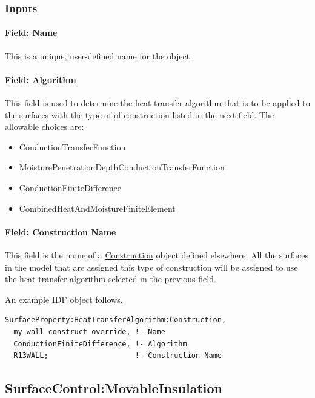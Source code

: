 \subsubsection{Inputs}\label{inputs-3}

\paragraph{Field: Name}

This is a unique, user-defined name for the object.

\paragraph{Field: Algorithm}\label{field-algorithm-3}

This field is used to determine the heat transfer algorithm that is to be applied to the surfaces with the type of of construction listed in the next field. The allowable choices are:

\begin{itemize}
\item
  ConductionTransferFunction
\item
  MoisturePenetrationDepthConductionTransferFunction
\item
  ConductionFiniteDifference
\item
  CombinedHeatAndMoistureFiniteElement
\end{itemize}

\paragraph{Field: Construction Name}\label{field-construction-name}

This field is the name of a \hyperref[construction-000]{Construction} object defined elsewhere. All the surfaces in the model that are assigned this type of construction will be assigned to use the heat transfer algorithm selected in the previous field.

An example IDF object follows.

\begin{lstlisting}
SurfaceProperty:HeatTransferAlgorithm:Construction,
  my wall construct override, !- Name
  ConductionFiniteDifference, !- Algorithm
  R13WALL;                    !- Construction Name
\end{lstlisting}

\subsection{SurfaceControl:MovableInsulation}\label{surfacecontrolmovableinsulation}


